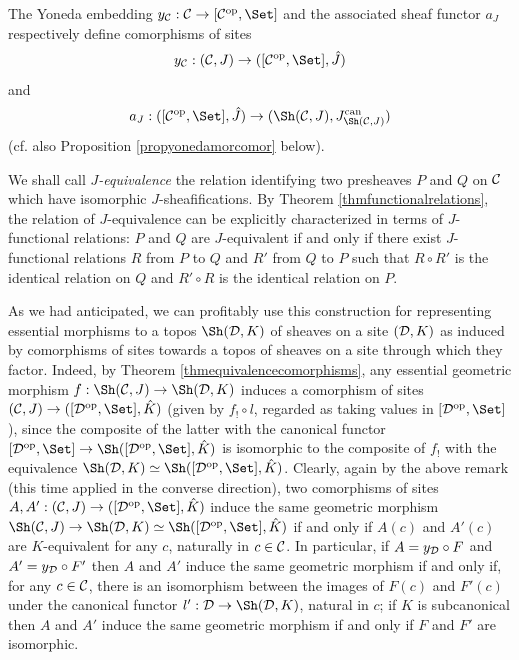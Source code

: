 \documentclass[a4paper,12pt]{article}
\begin{document}
The Yoneda embedding $y_{\cal C}:{\cal C}\to [{\cal C}^{\textup{op}}, \Set]$ and the associated sheaf functor $a_{J}$ respectively
define comorphisms of sites   
\[
y_{\cal C}:({\cal C}, J)\to ([{\cal C}^{\textup{op}}, \Set], \hat{J})
\]
and
\[
a_{J}:([{\cal C}^{\textup{op}}, \Set], \hat{J}) \to (\Sh({\cal C}, J), J^{\textup{can}}_{\Sh({\cal C}, J)})
\]
(cf. also Proposition \ref{propyonedamorcomor} below).

We shall call \emph{$J$-equivalence} the relation identifying two presheaves $P$ and $Q$ on $\cal C$ which have isomorphic $J$-sheafifications. By Theorem \ref{thmfunctionalrelations}, the relation of $J$-equivalence can be explicitly characterized in terms of $J$-functional relations: $P$ and $Q$ are $J$-equivalent if and only if there exist $J$-functional relations $R$ from $P$ to $Q$ and $R'$ from $Q$ to $P$ such that $R\circ R'$ is the identical relation on $Q$ and $R'\circ R$ is the identical relation on $P$.

As we had anticipated, we can profitably use this construction for representing essential morphisms to a topos $\Sh({\cal D}, K)$ of sheaves on a site $({\cal D}, K)$ as induced by comorphisms of sites towards a topos of sheaves on a site through which they factor. Indeed, by Theorem \ref{thmequivalencecomorphisms}, any essential geometric morphism $f:\Sh({\cal C}, J)\to \Sh({\cal D}, K)$ induces a comorphism of sites $({\cal C}, J)\to ([{\cal D}^{\textup{op}}, \Set], \hat{K})$ (given by $f_{!}\circ l$, regarded as taking values in $[{\cal D}^{\textup{op}}, \Set]$), since the composite of the latter with the canonical functor $[{\cal D}^{\textup{op}}, \Set]\to \Sh([{\cal D}^{\textup{op}}, \Set], \hat{K})$ is isomorphic to the composite of $f_{!}$ with the equivalence $\Sh({\cal D}, K) \simeq \Sh([{\cal D}^{\textup{op}}, \Set], \hat{K})$. Clearly, again by the above remark (this time applied in the converse direction), two comorphisms of sites $A, A':({\cal C}, J)\to ([{\cal D}^{\textup{op}}, \Set], \hat{K})$ induce the same geometric morphism $\Sh({\cal C}, J)\to \Sh({\cal D}, K) \simeq \Sh([{\cal D}^{\textup{op}}, \Set], \hat{K})$ if and only if $A(c)$ and $A'(c)$ are $K$-equivalent for any $c$, naturally in $c\in {\cal C}$. In particular, if $A=y_{\cal D}\circ F$ and $A'=y_{\cal D}\circ F'$ then $A$ and $A'$ induce the same geometric morphism if and only if, for any $c\in {\cal C}$, there is an isomorphism between the images of $F(c)$ and $F'(c)$ under the canonical functor $l':{\cal D}\to \Sh({\cal D}, K)$, natural in $c$; if $K$ is subcanonical then $A$ and $A'$ induce the same geometric morphism if and only if $F$ and $F'$ are isomorphic.
\end{document}
